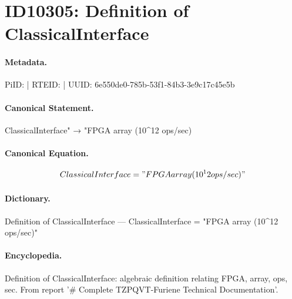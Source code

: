 \section*{ID10305: Definition of ClassicalInterface}
\paragraph{Metadata.}
PiID:  | RTEID:  | UUID: 6e550de0-785b-53f1-84b3-3e9c17c45e5b

\paragraph{Canonical Statement.}
ClassicalInterface" → "FPGA array (10\textasciicircum{}12 ops/sec)

\paragraph{Canonical Equation.}
\[
ClassicalInterface = "FPGA array (10^12 ops/sec)"
\]

\paragraph{Dictionary.}
Definition of ClassicalInterface — ClassicalInterface = "FPGA array (10\textasciicircum{}12 ops/sec)"

\paragraph{Encyclopedia.}
Definition of ClassicalInterface: algebraic definition relating FPGA, array, ops, sec. From report '\# Complete TZPQVT-Furiene Technical Documentation'.
